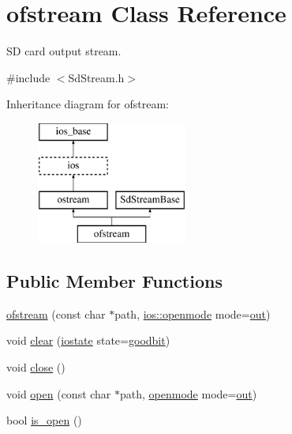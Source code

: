 \hypertarget{classofstream}{}\section{ofstream Class Reference}
\label{classofstream}


SD card output stream.  




{\ttfamily \#include $<$Sd\+Stream.\+h$>$}

Inheritance diagram for ofstream\+:\begin{figure}[H]
\begin{center}
\leavevmode
\includegraphics[height=4.000000cm]{classofstream}
\end{center}
\end{figure}
\subsection*{Public Member Functions}
\begin{DoxyCompactItemize}
\item 
\hyperlink{classofstream_ae8a8145adf2cfe1f948ad482ed504b75}{ofstream} (const char $\ast$path, \hyperlink{classios__base_aaa192ec0dccc43050715553a34644523}{ios\+::openmode} mode=\hyperlink{classios__base_a4c1d517774c0d11af3424e90395f26ae}{out})
\item 
void \hyperlink{classofstream_a09edfdb3dbda20aff105e751001313f0}{clear} (\hyperlink{classios__base_aef19291eeae0f072ac42c6ba1fe3033c}{iostate} state=\hyperlink{classios__base_a07a00996a6e525b88bdfe7935d5ead05}{goodbit})
\item 
void \hyperlink{classofstream_a240f3752c7ff7a78d10c143d2083715f}{close} ()
\item 
void \hyperlink{classofstream_a4b9d30c742fbe01baa336406c7afdcb2}{open} (const char $\ast$path, \hyperlink{classios__base_aaa192ec0dccc43050715553a34644523}{openmode} mode=\hyperlink{classios__base_a4c1d517774c0d11af3424e90395f26ae}{out})
\item 
bool \hyperlink{classofstream_a9c97eb2eb6e35ae87cf7f7453a67e70a}{is\+\_\+open} ()
\end{DoxyCompactItemize}

